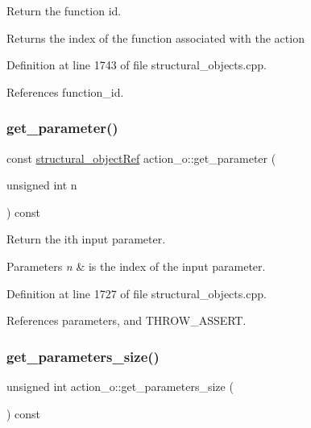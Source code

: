 Return the function id. 

\begin{DoxyReturn}{Returns}
the index of the function associated with the action 
\end{DoxyReturn}


Definition at line 1743 of file structural\+\_\+objects.\+cpp.



References function\+\_\+id.

\mbox{\label{classaction__o_a76a059c83cb9b86fe270841b5eb9d219}} 
\subsubsection{\texorpdfstring{get\+\_\+parameter()}{get\_parameter()}}
{\footnotesize\ttfamily const \hyperlink{structural__objects_8hpp_a8ea5f8cc50ab8f4c31e2751074ff60b2}{structural\+\_\+object\+Ref} action\+\_\+o\+::get\+\_\+parameter (\begin{DoxyParamCaption}\item[{unsigned int}]{n }\end{DoxyParamCaption}) const}



Return the ith input parameter. 


\begin{DoxyParams}{Parameters}
{\em n} & is the index of the input parameter. \\
\hline
\end{DoxyParams}


Definition at line 1727 of file structural\+\_\+objects.\+cpp.



References parameters, and T\+H\+R\+O\+W\+\_\+\+A\+S\+S\+E\+RT.

\mbox{\label{classaction__o_aecd3200231e0479c8e951cb1d95ece9d}} 
\subsubsection{\texorpdfstring{get\+\_\+parameters\+\_\+size()}{get\_parameters\_size()}}
{\footnotesize\ttfamily unsigned int action\+\_\+o\+::get\+\_\+parameters\+\_\+size (\begin{DoxyParamCaption}{ }\end{DoxyParamCaption}) const}



